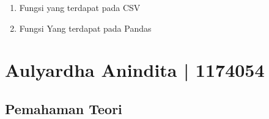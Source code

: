 \begin{enumerate}
\item
Fungsi yang terdapat pada CSV




\item
Fungsi Yang terdapat pada Pandas



\end{enumerate}

\section{Aulyardha Anindita | 1174054}

\subsection{Pemahaman Teori}
